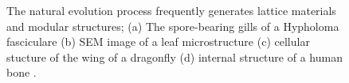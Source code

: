 \begin{figure}
    \hfill
    \bigskip
    \hfill
    \caption{The natural evolution process frequently generates lattice materials and modular structures; (a) The spore-bearing gills of a Hypholoma fasciculare \cite{nz_hypholoma_2023} (b) SEM image of a leaf microstructure \cite{library_leaf_nodate} (c) cellular stucture of the wing of a dragonfly \cite{gripspix_mostly_off_health_issues_wing_2007} (d) internal structure of a human bone \cite{noauthor_bone_03_nodate}.}
    \label{fig:02_nature}
\end{figure}

